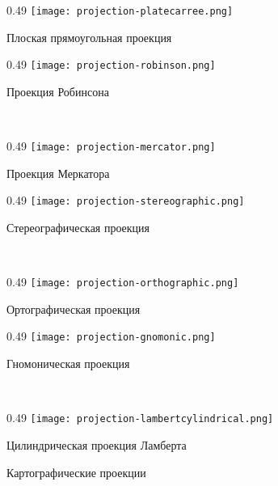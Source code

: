 \begin{figure}[p]
    \centering
    \begin{subcaptionblock}[b]{0.49\tw}
        \centering
        \texttt{[image: projection-platecarree.png]}
        \caption{Плоская прямоугольная проекция}
        \label{pic:map-projection-plate-carree}
    \end{subcaptionblock}
    \hfill
    \begin{subcaptionblock}[b]{0.49\tw}
        \centering
        \texttt{[image: projection-robinson.png]}
        \caption{Проекция Робинсона}
        \label{pic:map-projection-plate-robinson}
    \end{subcaptionblock}
    \\
    \begin{subcaptionblock}[b]{0.49\tw}
        \centering
        \texttt{[image: projection-mercator.png]}
        \caption{Проекция Меркатора}
        \label{pic:map-projection-mercator}
    \end{subcaptionblock}
    \hfill
    \begin{subcaptionblock}[b]{0.49\tw}
        \centering
        \texttt{[image: projection-stereographic.png]}
        \caption{Стереографическая проекция}
        \label{pic:map-projection-stereographic}
    \end{subcaptionblock}
    \\
    \begin{subcaptionblock}[b]{0.49\tw}
        \centering
        \texttt{[image: projection-orthographic.png]}
        \caption{Ортографическая проекция}
        \label{pic:map-projection-orthographic}
    \end{subcaptionblock}
    \hfill
    \begin{subcaptionblock}[b]{0.49\tw}
        \centering
        \texttt{[image: projection-gnomonic.png]}
        \caption{Гномоническая проекция}
        \label{pic:map-projection-gnomonic}
    \end{subcaptionblock}
    \\
    \begin{subcaptionblock}[b]{0.49\tw}
        \centering
        \texttt{[image: projection-lambertcylindrical.png]}
        \caption{Цилиндрическая проекция Ламберта}
        \label{pic:map-projection-lambertcylindrical}
    \end{subcaptionblock}
    \caption{Картографические проекции}
    \label{pic:map-projection}
\end{figure}